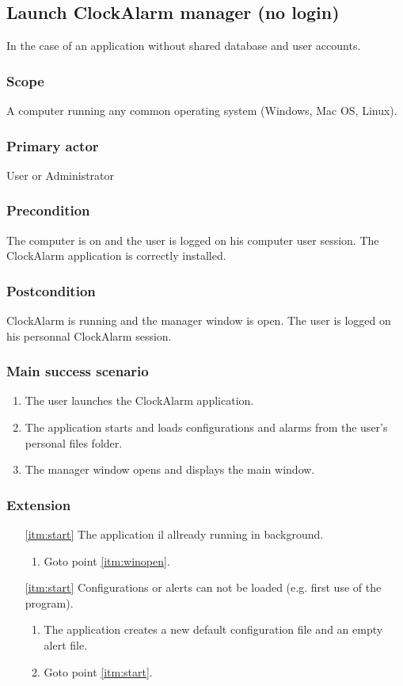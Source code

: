 \subsection{Launch ClockAlarm manager (no login)}
In the case of an application without shared database and user accounts.
\subsubsection{Scope}
A computer running any common operating system (Windows, Mac OS, Linux).
\subsubsection{Primary actor}
User or Administrator
\subsubsection{Precondition}
The computer is on and the user is logged on his computer user session. The ClockAlarm application is correctly installed.
\subsubsection{Postcondition}
ClockAlarm is running and the manager window is open. The user is logged on his personnal ClockAlarm session.
\subsubsection{Main success scenario}
\begin{enumerate}
	\item The user launches the ClockAlarm application.
	\item \label{itm:start} The application starts and loads configurations and alarms from the user's personal files folder.
	\item \label{itm:winopen} The manager window opens and displays the main window.
\end{enumerate}
\subsubsection{Extension}
\begin{enumerate}
	\item[\ref{itm:start}] The application il allready running in background.
	\begin{enumerate}[i]
		\item Goto point \ref{itm:winopen}.
	\end{enumerate}
	
	\item[\ref{itm:start}] Configurations or alerts can not be loaded (e.g. first use of the program).
	\begin{enumerate}[i]
		\item The application creates a new default configuration file and an empty alert file.
		\item Goto point \ref{itm:start}.
	\end{enumerate}
\end{enumerate}

